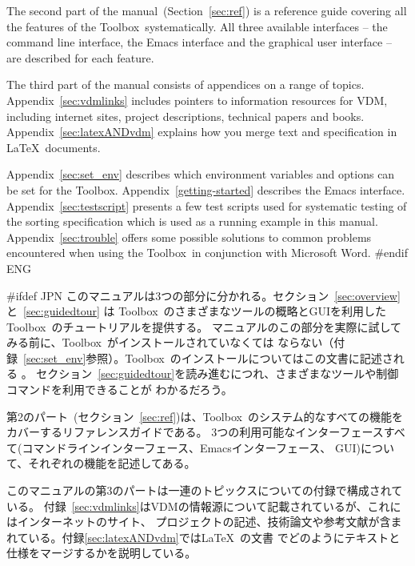 \documentclass[\pformat,12pt]{article}
\newcommand{\Toolbox}{Toolbox}
\newcommand{\Toolbox}{Toolbox}
\begin{document}
The second part of the manual~(Section~\ref{sec:ref}) is a reference
guide covering all the features of the \Toolbox\ systematically. All three
available interfaces -- the command line interface, the Emacs interface
and the graphical user interface -- are described for each feature.

The third part of the manual consists of appendices on a range of
topics. 
 Appendix~\ref{sec:vdmlinks} includes
pointers to information resources for VDM, including internet sites,
project descriptions, technical papers and books.
Appendix~\ref{sec:latexANDvdm} explains how you merge text and
specification in \LaTeX\ documents.

Appendix~\ref{sec:set_env} describes which environment
variables and options can be set for the \Toolbox.
Appendix~\ref{getting-started} describes the Emacs interface.
Appendix~\ref{sec:testscript} presents a few test scripts used for
systematic testing of the sorting specification which is used as a
running example in this manual.  
Appendix~\ref{sec:trouble} offers some possible solutions 
to common problems encountered when using the \Toolbox\ in conjunction
with Microsoft Word.  
#endif ENG

#ifdef JPN
このマニュアルは3つの部分に分かれる。セクション~\ref{sec:overview}と~\ref{sec:guidedtour} は
\Toolbox\ のさまざまなツールの概略とGUIを利用した\Toolbox\ のチュートリアルを提供する。
マニュアルのこの部分を実際に試してみる前に、\Toolbox\ がインストールされていなくては
ならない（付録~\ref{sec:set_env}参照）。\Toolbox\ のインストールについてはこの文書に記述される
 。
セクション~\ref{sec:guidedtour}を読み進むにつれ、さまざまなツールや制御コマンドを利用できることが
わかるだろう。

第2のパート~(セクション~\ref{sec:ref})は、\Toolbox\ のシステム的なすべての機能を
カバーするリファレンスガイドである。
3つの利用可能なインターフェースすべて(コマンドラインインターフェース、Emacsインターフェース、
GUI)について、それぞれの機能を記述してある。

このマニュアルの第3のパートは一連のトピックスについての付録で構成されている。
付録~\ref{sec:vdmlinks}はVDMの情報源について記載されているが、これにはインターネットのサイト、
プロジェクトの記述、技術論文や参考文献が含まれている。付録\ref{sec:latexANDvdm}では\LaTeX\ の文書
でどのようにテキストと仕様をマージするかを説明している。
\end{document}
